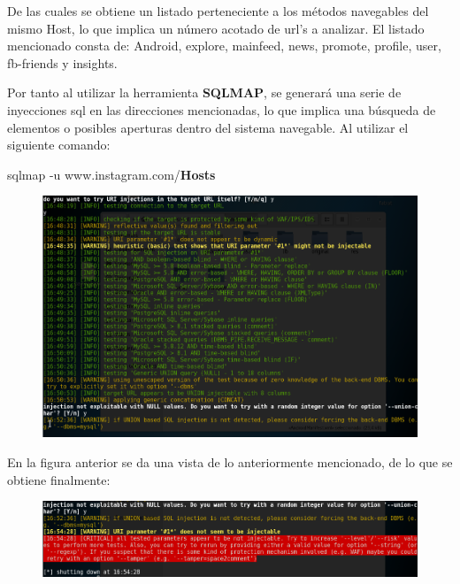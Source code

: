 \documentclass[a4paper,11pt]{article}
\theoremstyle{mytheor}
\begin{document}
\begin{itemize}
    De las cuales se obtiene un listado perteneciente a los métodos navegables del mismo Host, lo que implica un número acotado de url's a analizar. El listado mencionado consta de: Android, explore, mainfeed, news, promote, profile, user, fb-friends y insights.
    
    Por tanto al utilizar la herramienta \textbf{SQLMAP}, se generará una serie de inyecciones sql en las direcciones mencionadas, lo que implica una búsqueda de elementos o posibles aperturas dentro del sistema navegable. Al utilizar el siguiente comando:
    
    \begin{center}
        sqlmap -u www.instagram.com/\textbf{Hosts}
    \end{center}
    
    \newpage
    
     \begin{figure}[!h]
    \centering
    \includegraphics[scale=0.3]{testsqlmap.png}
    \label{fig:my_label}
    \end{figure}
    
    En la figura anterior se da una vista de lo anteriormente mencionado, de lo que se obtiene finalmente:
    
     \begin{figure}[!h]
    \centering
    \includegraphics[scale=0.3]{testeo2.png}
    \label{fig:my_label}
    \end{figure}
    

\end{itemize}
\end{document}
